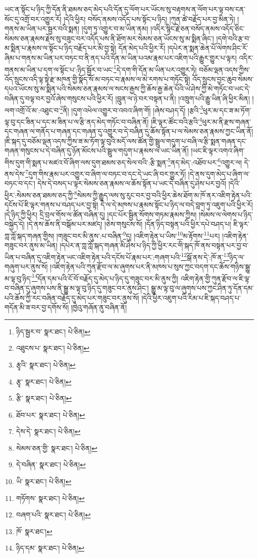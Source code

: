ཡང་ན་སྟོང་པ་ཉིད་ཀྱི་དོན་ནི་ཐམས་ཅད་མེད་པའི་དོན་དུ་ལོག་པར་ཡོངས་སུ་བརྟགས་ན་ལོག་པར་ལྟ་བས་ངན་སོང་དུ་འགྲོ་བར་འགྱུར་རོ། །དེའི་ཕྱིར། བསོད་ནམས་འདོད་པས་སྟོང་པ་ཉིད། །ཀུན་ཚེ་བརྗོད་པར་བྱ་མིན་ཏེ། །གནས་མ་ཡིན་པར་སྦྱར་བའི་སྨན། །དུག་ཏུ་འགྱུར་བ་མ་ཡིན་ནམ། །འདིར་སྙིང་རྗེ་ཅན་བསོད་ནམས་འདོད་ཅིང་སེམས་ཅན་རྣམས་རྗེས་སུ་བཟུང་བར་འདོད་པས་ནི་ཐོག་མར་སེམས་ཅན་ཡོངས་སུ་མ་སྨིན་ཞིང་། །དགེ་བའི་རྩ་བ་མ་སྨིན་པ་རྣམས་ལ་སྟོང་པ་ཉིད་བརྗོད་པར་མི་བྱ་སྟེ། དོན་མེད་པའི་ཕྱིར་རོ། །དཔེར་ན་སྨན་ཆེན་པོ་ལེགས་ཤིང་རོ་ཞིམ་པ་གནས་མ་ཡིན་པར་བཏང་བ་ནི་ནད་པའི་དོན་མ་ཡིན་པའམ་རྣམ་པར་འཇིག་པའི་རྒྱུར་གྱུར་པ་ལྟར། འདིར་གནས་མ་ཡིན་པ་དག་ལ་སྟོང་པ་:ཉིད་སྦྱོར་བ་ཡང་\footnote{ཉིད་སྦྱར་བ་  སྣར་ཐང་།  པེ་ཅིན། }དེ་དག་གི་དོན་མ་ཡིན་པར་འགྱུར་ཏེ། བཅོམ་ལྡན་འདས་ཀྱིས་འོད་སྲུངས་འདི་ལྟ་སྟེ་རྫ་མཁན་གྱི་སྣོད་སོ་མ་བཏང་བ་རྣམས་ལ་མེ་རགས་པ་གཏོང་སྟེ། འོད་སྲུངས་བྱང་ཆུབ་སེམས་དཔའ་ཡོངས་སུ་མ་སྨིན་པའི་སེམས་ཅན་རྣམས་ལ་སངས་རྒྱས་ཀྱི་ཆོས་རྒྱ་ཆེན་པོའི་ཡེ་ཤེས་ཀྱི་མེ་གཏོང་བ་ཡང་དེ་བཞིན་དུ་བལྟ་བར་བྱའོ་ཞེས་གསུངས་པའི་ཕྱིར་རོ། །བླུན་ལ་ཉེ་བར་བསྟན་པ་ནི། །འཁྲུག་པའི་རྒྱུ་ཡིན་ཞི་ཕྱིར་མིན། །ལག་འགྲོ་འོ་མ་:འཐུང་བ་\footnote{འཐུངས་པ་  སྣར་ཐང་།  པེ་ཅིན། }ནི། །དུག་འཕེལ་འགྱུར་བ་འབའ་ཞིག་གོ། །ཞེས་བཤད་དོ། །རྩའི་\footnote{རྩྭའི་  སྣར་ཐང་།  པེ་ཅིན། }ཕུར་མ་དང་ཟ་མ་ཏོག་ལྟ་བུ་དང་ཟིན་པ་དང་མ་ཟིན་པ་ལ་རྩི་ནད་མེད་གཏོང་བ་བཞིན་ནོ། །ཇི་ལྟར་ཚོང་བའི་རྩའི་\footnote{རྩྭ་  སྣར་ཐང་།  པེ་ཅིན། }ཕུར་མ་ནི་རྫས་གཞན་དང་གཞན་ལ་གནོད་པ་གཞན་དང་གཞན་དུ་འགྱུར་བ་དེ་བཞིན་དུ་ཆོས་སྟོན་པ་ལ་སེམས་ཅན་རྣམས་ཀྱང་ཡིན་ནོ། །ཇི་སྐད་དུ་བཅོམ་ལྡན་འདས་ཀྱིས་ཟ་མ་ཏོག་ལྟ་བུའི་མདོ་ལས་ཚོན་གྱི་སྦྲུལ་གདུག་པ་བཞི་ལ་རྩི་སྨན་གཞན་དང་གཞན་གསུངས་པ་དེ་བཞིན་དུ་ཉོན་མོངས་པའི་སྦྲུལ་གདུག་པ་རྣམས་ལ་ཡང་ཡིན་ནོ། །ཡང་ཇི་ལྟར་འགའ་ཞིག་གིས་དུག་གི་སྨན་པ་མཛའ་བོ་ཞིག་ལས་དུག་ཐམས་ཅད་སེལ་བའི་:རྩི་སྨན་\footnote{རྩི་  སྣར་ཐང་།  པེ་ཅིན། }ནད་མེད་:འཐོབ་པར་\footnote{ཐོབ་པར་  སྣར་ཐང་།  པེ་ཅིན། }འགྱུར་ལ། དེ་ནས་དེས་\footnote{དེས་དེ་  སྣར་ཐང་།  པེ་ཅིན། }དུག་གིས་རྣམ་པར་འགྱུར་བ་ཞིག་ལ་བཏང་བ་དང་དེ་ཡང་ཞི་བར་གྱུར་ཏོ། །དེ་ནས་དུག་མེད་པ་ཞིག་ལ་བཏང་བ་དང་། དེས་དེ་བསད་པ་ལྟར་སེམས་ཅན་རྣམས་ལ་ཆོས་སྟོན་པ་ཡང་དེ་བཞིན་དུ་ཤེས་པར་བྱའོ། །དེའི་ཕྱིར་:སེམས་ཅན་ཐམས་ཅད་ཀྱི་\footnote{སེམས་ཅན་གྱི་  སྣར་ཐང་།  པེ་ཅིན། }སེམས་ཀྱི་རྒྱུད་ལས་སུ་རུང་བར་བྱ་བའི་ཕྱིར་ཆེས་ཐོག་མ་ཁོ་ནར་འཇིག་རྟེན་པའི་དངོས་པོ་ཇི་ལྟར་གནས་པ་བཤད་པར་བྱ་སྟེ། དེ་ལ་དེ་མཁས་པ་རྣམས་སྟོང་པ་ཉིད་ལ་བདེ་བླག་ཏུ་འཇུག་པའི་ཕྱིར་རོ། །དེ་ཉིད་ཀྱི་ཕྱིར། དྲི་བྲལ་གོས་ལ་ཚོན་བཞིན་དུ། །དང་པོར་སྦྱིན་སོགས་གཏམ་རྣམས་ཀྱིས། །སེམས་ལ་ལེགས་པ་ཉིད་བསྐྱེད་དེ། །དེ་ནས་ཆོས་ནི་བསྒོམ་པར་མཛད། །ཅེས་གསུངས་སོ། །དོན་ཉིད་བསྟན་པའི་ཕྱིར་དཔེ་བཤད་པ། ཇི་ལྟར་ཀླ་ཀློ་སྐད་གཞན་གྱིས། །གཟུང་བར་མི་ནུས་:པ་བཞིན་\footnote{དེ་བཞིན་  སྣར་ཐང་།  པེ་ཅིན། }དུ། །འཇིག་རྟེན་པ་ཡིས་\footnote{ཡི་  སྣར་ཐང་།  པེ་ཅིན། }མ་རྟོགས་\footnote{གཏོགས་  སྣར་ཐང་།  པེ་ཅིན། }པར། །འཇིག་རྟེན་གཟུང་བར་ནུས་མ་ཡིན། །དཔེར་ན་ཀླ་ཀློ་སྐད་གཞན་མི་ཤེས་པ་ཉིད་ཀྱི་ཕྱིར་རང་གི་སྐད་ཁོ་ནས་བསྟན་པར་བྱ་བ་ཡིན་པ་བཞིན་དུ་འཇིག་རྟེན་ཡང་འཇིག་རྟེན་པའི་དངོས་པོ་རྣམ་པར་:གཞག་པའི་\footnote{བཞག་པའི་  སྣར་ཐང་།  པེ་ཅིན། }སྒོ་ནས་དེ་:ཁོ་ན་\footnote{ཁོ་  སྣར་ཐང་། }ཉིད་ལ་གཞུག་པར་ནུས་སོ། །འཇིག་རྟེན་པའི་ཀུན་རྫོབ་ལ་མ་ཞུགས་པར་ནི་མཁས་པ་སུས་ཀྱང་བདག་དང་ཆོས་གཉིས་སྒྱུ་མ་ལྟ་བུ་ཉིད་\footnote{ཉིད་དམ་  སྣར་ཐང་།  པེ་ཅིན། }དོན་དམ་པའི་ངོ་བོ་བརྗོད་དུ་མེད་པ་ཉིད་དུ་གཟུང་བར་མི་ནུས་ཀྱི། འཇིག་རྟེན་གྱི་ཀུན་རྫོབ་ལ་ཇི་ལྟ་བ་བཞིན་དུ་ཞུགས་པས་ནི་སྒྱུ་མ་ལྟ་བུ་ཉིད་དུ་གཟུང་བར་ནུས་ཤིང་། སྒྱུ་མ་ལྟ་བུ་ལ་ཞུགས་པས་ཀྱང་ཤིན་ཏུ་དོན་དམ་པའི་ཆོས་ཀྱི་རང་བཞིན་བརྗོད་དུ་མེད་པར་གཟུང་བར་ནུས་སོ། །དེའི་ཕྱིར་འཇུག་པའི་རིམ་པ་ཇི་སྐད་བཤད་པ་གདོན་མི་ཟ་བར་བྱ་དགོས་སོ། །ཁྱེའུ་གཞོན་ནུ་བཞིན་ནོ། 
